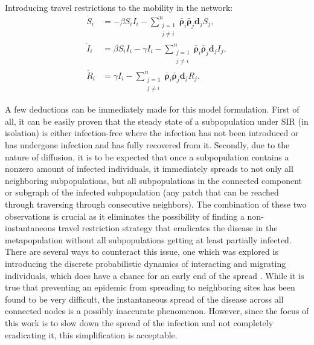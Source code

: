 Introducing travel restrictions to the mobility in the network:
\begin{equation}    
\begin{aligned}
        \dot{S}_{i} &= -\beta S_{i} I_{i} - \sum_{\substack{j=1 \\ j \neq i}}^n \mathbf{\bar \rho}_i \mathbf{\bar \rho}_j \mathbf{d}_j S_j, \\
        \dot{I}_{i} &= \beta S_{i} I_{i} - \gamma I_{i} - \sum_{\substack{j=1 \\ j \neq i}}^n \mathbf{\bar \rho}_i \mathbf{\bar \rho}_j \mathbf{d}_j I_j, \\
        \dot{R}_{i} &= \gamma I_{i} - \sum_{\substack{j=1 \\ j \neq i}}^n \mathbf{\bar \rho}_i \mathbf{\bar \rho}_j \mathbf{d}_j R_j.
\end{aligned}
\end{equation}

A few deductions can be immediately made for this model formulation. First of all, it can be easily proven that the steady state of a subpopulation under SIR (in isolation) is either infection-free where the infection has not been introduced or has undergone infection and has fully recovered from it. Secondly, due to the nature of diffusion, it is to be expected that once a subpopulation contains a nonzero amount of infected individuals, it immediately spreads to not only all neighboring subpopulations, but all subpopulations in the connected component or subgraph of the infected subpopulation (any patch that can be reached through traversing through consecutive neighbors). The combination of these two observations is crucial as it eliminates the possibility of finding a non-instantaneous travel restriction strategy that eradicates the disease in the metapopulation without all subpopulations getting at least partially infected. There are several ways to counteract this issue, one which was explored is introducing the discrete probabilistic dynamics of interacting and migrating individuals, which does have a chance for an early end of the spread \cite{colizza2008epidemic}. While it is true that preventing an epidemic from spreading to neighboring sites has been found to be very difficult, the instantaneous spread of the disease across all connected nodes is a possibly inaccurate phenomenon. However, since the focus of this work is to slow down the spread of the infection and not completely eradicating it, this simplification is acceptable. \\

